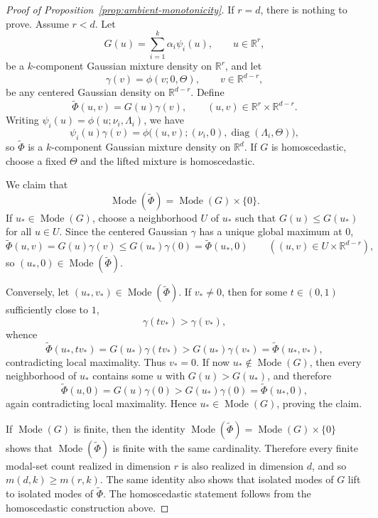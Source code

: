 \documentclass[11pt]{article}
\theoremstyle{plain}
\theoremstyle{definition}
\theoremstyle{remark}
\numberwithin{equation}{section}
\DeclareMathOperator{\diag}{diag}
\DeclareMathOperator{\Mode}{Mode}
\newcommand{\R}{\mathbb{R}}
\begin{document}
\begin{proof}[Proof of Proposition~\ref{prop:ambient-monotonicity}]
If $r=d$, there is nothing to prove. Assume $r<d$. Let
\[
G(u)=\sum_{i=1}^k \alpha_i\psi_i(u),\qquad u\in\R^r,
\]
be a $k$-component Gaussian mixture density on $\R^r$, and let
\[
\gamma(v)=\phi(v;0,\Theta),\qquad v\in\R^{d-r},
\]
be any centered Gaussian density on $\R^{d-r}$. Define
\[
\widetilde \Phi(u,v)=G(u)\gamma(v),\qquad (u,v)\in\R^r\times\R^{d-r}.
\]
Writing $\psi_i(u)=\phi(u;\nu_i,\Lambda_i)$, we have
\[
\psi_i(u)\gamma(v)=\phi\bigl((u,v);(\nu_i,0),\diag(\Lambda_i,\Theta)\bigr),
\]
so $\widetilde \Phi$ is a $k$-component Gaussian mixture density on $\R^d$. If $G$ is homoscedastic, choose a fixed $\Theta$ and the lifted mixture is homoscedastic.

We claim that
\[
\Mode(\widetilde \Phi)=\Mode(G)\times\{0\}.
\]
If $u_\ast\in \Mode(G)$, choose a neighborhood $U$ of $u_\ast$ such that $G(u)\le G(u_\ast)$ for all $u\in U$. Since the centered Gaussian $\gamma$ has a unique global maximum at $0$,
\[
\widetilde \Phi(u,v)=G(u)\gamma(v)\le G(u_\ast)\gamma(0)=\widetilde \Phi(u_\ast,0)
\qquad ((u,v)\in U\times\R^{d-r}),
\]
so $(u_\ast,0)\in\Mode(\widetilde \Phi)$.

Conversely, let $(u_\ast,v_\ast)\in\Mode(\widetilde \Phi)$. If $v_\ast\neq 0$, then for some $t\in(0,1)$ sufficiently close to $1$,
\[
\gamma(tv_\ast)>\gamma(v_\ast),
\]
whence
\[
\widetilde \Phi(u_\ast,tv_\ast)=G(u_\ast)\gamma(tv_\ast)>G(u_\ast)\gamma(v_\ast)=\widetilde \Phi(u_\ast,v_\ast),
\]
contradicting local maximality. Thus $v_\ast=0$. If now $u_\ast\notin\Mode(G)$, then every neighborhood of $u_\ast$ contains some $u$ with $G(u)>G(u_\ast)$, and therefore
\[
\widetilde \Phi(u,0)=G(u)\gamma(0)>G(u_\ast)\gamma(0)=\widetilde \Phi(u_\ast,0),
\]
again contradicting local maximality. Hence $u_\ast\in\Mode(G)$, proving the claim.

If $\Mode(G)$ is finite, then the identity $\Mode(\widetilde\Phi)=\Mode(G)\times\{0\}$ shows that $\Mode(\widetilde\Phi)$ is finite with the same cardinality. Therefore every finite modal-set count realized in dimension $r$ is also realized in dimension $d$, and so $m(d,k)\ge m(r,k)$. The same identity also shows that isolated modes of $G$ lift to isolated modes of $\widetilde\Phi$. The homoscedastic statement follows from the homoscedastic construction above.
\end{proof}
\end{document}
